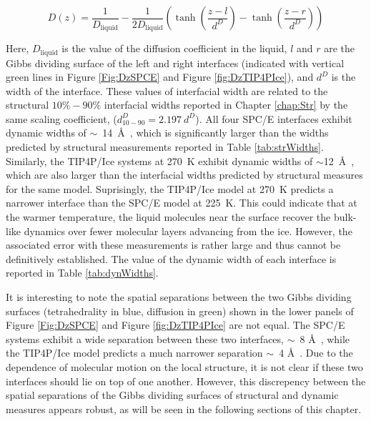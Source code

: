 \begin{equation}\label{eq:Dfit}
  D(z) = \frac{1}{D_\mathrm{liquid}} - \frac{1}{2D_\mathrm{liquid}} \left(
      \tanh \left( \frac{z-l}{d^D} \right) - \tanh \left( \frac{z-r}{d^D} \right) \right)
\end{equation}
  
Here, $D_\mathrm{liquid}$ is the value of the diffusion coefficient in
the liquid, $l$ and $r$ are the Gibbs dividing surface of the left and
right interfaces (indicated with vertical green lines in Figure
\ref{Fig:DzSPCE} and Figure \ref{fig:DzTIP4PIce}), and $d^{D}$ is the
width of the interface. These values of interfacial width are related
to the structural $10\%-90\%$ interfacial widths reported in Chapter
\ref{chap:Str} by the same scaling coefficient,
($d_\mathrm{10-90}^{D} = 2.197~d^{D}$). All four SPC/E interfaces
exhibit dynamic widths of $\sim$~14~\AA~, which is significantly
larger than the widths predicted by structural measurements reported
in Table \ref{tab:strWidths}. Similarly, the TIP4P/Ice systems at
270~K exhibit dynamic widths of $\sim$12~\AA~, which are also larger
than the interfacial widths predicted by structural measures for the
same model. Suprisingly, the TIP4P/Ice model at 270~K predicts a
narrower interface than the SPC/E model at 225~K. This could indicate
that at the warmer temperature, the liquid molecules near the surface
recover the bulk-like dynamics over fewer molecular layers advancing
from the ice. However, the associated error with these measurements is
rather large and thus cannot be definitively established. The value of
the dynamic width of each interface is reported in Table
\ref{tab:dynWidths}.

It is interesting to note the spatial separations between the two
Gibbs dividing surfaces (tetrahedrality in blue, diffusion in green)
shown in the lower panels of Figure \ref{Fig:DzSPCE} and Figure
\ref{fig:DzTIP4PIce} are not equal. The SPC/E systems exhibit a wide
separation between these two interfaces, $\sim$~8 \AA~, while the
TIP4P/Ice model predicts a much narrower separation $\sim$~4
\AA~. Due to the dependence of molecular motion on the local
structure, it is not clear if these two interfaces should lie on top
of one another. However, this discrepency between the spatial
separations of the Gibbs dividing surfaces of structural and dynamic
measures appears robust, as will be seen in the following sections of
this chapter.

